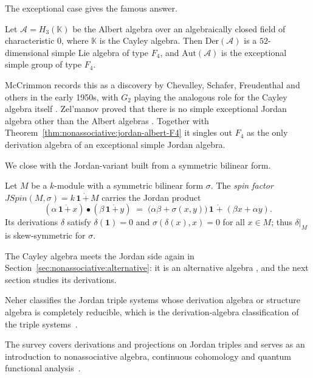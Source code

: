 The exceptional case gives the famous answer.

\begin{theorem}
\label{thm:nonassociative:jordan-albert-F4}
Let $\mathcal{A}=H_3(\mathbb{K})$ be the Albert algebra over an
algebraically closed field of characteristic $0$, where $\mathbb{K}$
is the Cayley algebra. Then $\mathrm{Der}(\mathcal{A})$ is a
$52$-dimensional simple Lie algebra of type $F_4$, and
$\mathrm{Aut}(\mathcal{A})$ is the exceptional simple group of type
$F_4$.
\end{theorem}

McCrimmon records this as a discovery by Chevalley, Schafer, Freudenthal
and others in the early 1950s, with $G_2$ playing the analogous role for
the Cayley algebra itself \cite[p.~52]{McCrimmon2004Taste}. Zel'manov
proved that there is no simple exceptional Jordan algebra other
than the Albert algebras \cite[pp.~103--111]{Zelmanov1979Prime}. Together
with Theorem~\ref{thm:nonassociative:jordan-albert-F4} it singles out
$F_4$ as the only derivation algebra of an exceptional simple Jordan
algebra.

We close with the Jordan-variant built from a symmetric bilinear form.

\begin{example}
\label{ex:nonassociative:jordan-spin}
Let $M$ be a $k$-module with a symmetric bilinear form $\sigma$. The
\emph{spin factor}
$JSpin(M,\sigma) = k\,\mathbf{1}\,\dot{+}\,M$ carries the Jordan
product
\[
(\alpha\,\mathbf{1}\,\dot{+}\,x)\bullet(\beta\,\mathbf{1}\,\dot{+}\,y)
\;=\;\bigl(\alpha\beta+\sigma(x,y)\bigr)\,\mathbf{1}\;\dot{+}\;
(\beta x+\alpha y).
\]
Its derivations $\delta$ satisfy $\delta(\mathbf{1})=0$ and
$\sigma(\delta(x),x)=0$ for all $x\in M$; thus $\delta|_{M}$ is
skew-symmetric for $\sigma$.
\end{example}

The Cayley algebra meets the Jordan side again in
Section~\ref{sec:nonassociative:alternative}: it is an alternative
algebra \cite[p.~148]{Baez2002Octonions}, and the next section studies
its derivations.

Neher classifies the Jordan triple systems whose derivation algebra or structure algebra is completely reducible, which is the derivation-algebra classification of the triple systems~\cite{WlJordanTripleSystemsWithComplet1984}.

The survey covers derivations and projections on Jordan triples and serves as an introduction to nonassociative algebra, continuous cohomology and quantum functional analysis~\cite{WlDerivationsAndProjectionsOnJor2020}.
